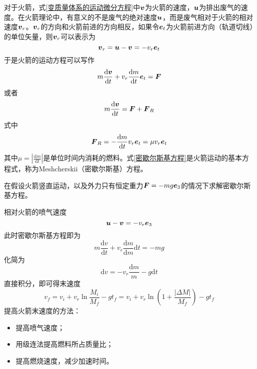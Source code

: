 对于火箭，式\eqref{变质量体系的运动微分方程}中$\boldsymbol{v}$为火箭的速度，$\boldsymbol{u}$为排出废气的速度。在火箭理论中，有意义的不是废气的绝对速度$\boldsymbol{u}$，而是废气相对于火箭的相对速度$\boldsymbol{v}_r$。$\boldsymbol{v}_r$的方向和火箭前进的方向相反，如果令$\boldsymbol{e}_t$为火箭前进方向（轨道切线）的单位矢量，则$\boldsymbol{v}_r$可以表示为
\begin{equation*}
	\boldsymbol{v}_r = \boldsymbol{u} - \boldsymbol{v} = -v_r \boldsymbol{e}_t
\end{equation*}
于是火箭的运动方程可以写作
\begin{equation*}
	m\frac{\mathrm{d} \boldsymbol{v}}{\mathrm{d} t} + v_r \frac{\mathrm{d} m}{\mathrm{d} t} \boldsymbol{e}_t = \boldsymbol{F}
\end{equation*}
或者
\begin{equation}
	m\frac{\mathrm{d} \boldsymbol{v}}{\mathrm{d} t} = \boldsymbol{F} + \boldsymbol{F}_R
	\label{密歇尔斯基方程}
\end{equation}
式中
\begin{equation*}
	\boldsymbol{F}_R = -\frac{\mathrm{d} m}{\mathrm{d} t} v_r \boldsymbol{e}_t = \mu v_r \boldsymbol{e}_t
\end{equation*}
其中$\displaystyle \mu = \left|\frac{\mathrm{d} m}{\mathrm{d} t}\right|$是单位时间内消耗的燃料。式\eqref{密歇尔斯基方程}是火箭运动的基本方程式，称为{\heiti Meshcherskii（密歇尔斯基）方程}。

\begin{example}[重力场中的火箭]
在假设火箭竖直运动，以及外力只有恒定重力$\boldsymbol{F} = -mg\boldsymbol{e}_3$的情况下求解密歇尔斯基方程。
\end{example}
\begin{solution}
相对火箭的喷气速度
\begin{equation*}
	\boldsymbol{u}-\boldsymbol{v} = -v_r \boldsymbol{e}_3
\end{equation*}
此时密歇尔斯基方程即为
\begin{equation*}
	m\frac{\mathrm{d} v}{\mathrm{d} t} + v_r\frac{\mathrm{d} m}{\mathrm{d} m}{\mathrm{d} t} = -mg
\end{equation*}
化简为
\begin{equation*}
	\mathrm{d} v = -v_r \frac{\mathrm{d} m}{m} - g\mathrm{d} t
\end{equation*}
直接积分，即可得末速度
\begin{equation*}
	v_f = v_i + v_r \ln \frac{M_i}{M_f} - gt_f = v_i + v_r \ln \left(1+\frac{|\Delta M|}{M_f}\right) - gt_f
\end{equation*}
提高火箭末速度的方法：
\begin{itemize}
	\item 提高喷气速度；
	\item 用级连法提高燃料所占质量比；
	\item 提高燃烧速度，减少加速时间。
\end{itemize}
\end{solution}

